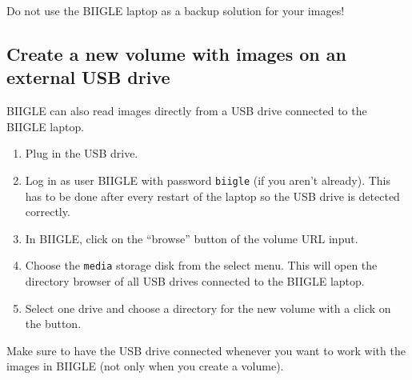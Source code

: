 Do not use the BIIGLE laptop as a backup solution for your images!

\subsection*{Create a new volume with images on an external USB drive}

BIIGLE can also read images directly from a USB drive connected to the BIIGLE laptop.

\begin{enumerate}
  \item Plug in the USB drive.
  \item Log in as user BIIGLE with password \texttt{biigle} (if you aren't already). This has to be done after every restart of the laptop so the USB drive is detected correctly.
  \item In BIIGLE, click on the ``browse'' button of the volume URL input.
  \item Choose the \texttt{media} storage disk from the select menu. This will open the directory browser of all USB drives connected to the BIIGLE laptop.
  \item Select one drive and choose a directory for the new volume with a click on the  button.
\end{enumerate}

Make sure to have the USB drive connected whenever you want to work with the images in BIIGLE (not only when you create a volume).




